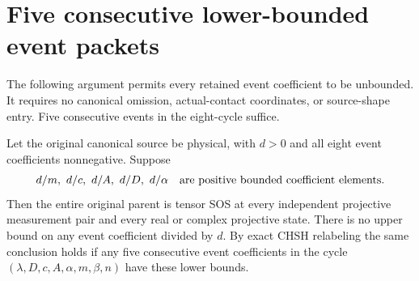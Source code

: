 \section{\texorpdfstring{Five consecutive lower-bounded event packets}{Five consecutive lower-bounded event packets}}
\label{component:p80253fe9bc1b}

\label{p80253fe9bc1b:sec:five-retained-events}

The following argument permits every retained event coefficient to be
unbounded. It requires no canonical omission, actual-contact coordinates,
or source-shape entry. Five consecutive events in the eight-cycle suffice.

\begin{theorem}
\label{p80253fe9bc1b:thm:five-retained-events}
Let the original canonical source be physical, with $d>0$ and all eight
event coefficients nonnegative. Suppose
\[
 d/m,\ d/c,\ d/A,\ d/D,\ d/\alpha
 \quad\hbox{are positive bounded coefficient elements}.
\]
Then the entire original parent is tensor SOS at every independent
projective measurement pair and every real or complex projective state.
There is no upper bound on any event coefficient divided by $d$.
By exact CHSH relabeling the same conclusion holds if any five
consecutive event coefficients in the cycle
$(\lambda,D,c,A,\alpha,m,\beta,n)$ have these lower bounds.
\end{theorem}

